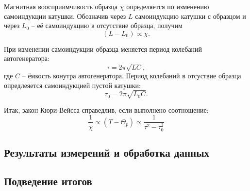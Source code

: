 \documentclass[12pt,a4paper]{article}
\begin{document}
Магнитная воосприимчивость образца $\chi$ определяется по изменению самоиндукции катушки. 
Обозначив через $L$ самоиндукцию катушки с образцом и через $L_0$ -- её самоиндукцию в отсутствие образца, получим
\[
    (L-L_0)\propto \chi.
\]

При изменении самоиндукции образца меняется период колебаний автогенератора:
\[    \tau = 2\pi \sqrt{LC}, \]
где $C$ -- ёмкость конутра автогенератора. Период колебаний в отсуствие образца опредлеяется самоиндукцией пустой катушки:
\[    \tau_0 = 2\pi \sqrt{L_0C}. \]

Итак, закон Кюри-Вейсса справедлив, если выполнено соотношение:
\begin{equation}
    \frac{1}{\chi} \propto (T-\Theta_p) \propto \frac{1}{\tau^2-\tau_0^2}
\end{equation}

\subsection*{Результаты измерений и обработка данных}

\subsection*{Подведение итогов}
\end{document}
